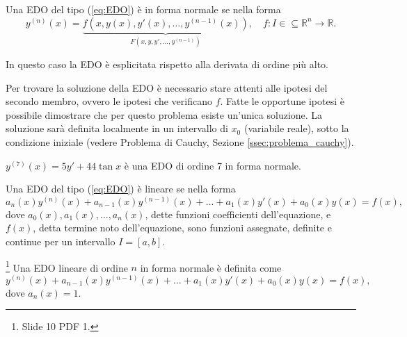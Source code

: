 \begin{definition}
    Una EDO del tipo (\ref{eq:EDO}) è in forma normale se nella forma
    \begin{equation}\label{eq:EDO_forma_normale}
        y^{(n)}(x)=\underbrace{f(x, y(x), y'(x),\hdots,y^{(n-1)}(x))}_{F(x, y, y',\hdots, y^{(n-1)})}, \quad f\colon I\in\subseteq\mathbb R^{n}\rightarrow\mathbb R.
    \end{equation}
\end{definition}

In questo caso la EDO è esplicitata rispetto alla derivata di ordine più alto.

Per trovare la soluzione della EDO è necessario stare attenti alle ipotesi del secondo membro, ovvero le ipotesi che verificano $f$. Fatte le opportune ipotesi è possibile dimostrare che per questo problema esiste un'unica soluzione. La soluzione sarà definita localmente in un intervallo di $x_0$ (variabile reale), sotto la condizione iniziale (vedere Problema di Cauchy, Sezione \ref{ssec:problema_cauchy}).

\begin{example}
    $y^{(7)}(x)=5y'+44\tan x$ è una EDO di ordine 7 in forma normale.
\end{example}
\begin{definition}
    Una EDO del tipo (\ref{eq:EDO}) è lineare se nella forma
    \begin{equation}\label{eq:EDO_lineare_ordine_n}
        a_n(x)y^{(n)}(x)+a_{n-1}(x)y^{(n-1)}(x)+\hdots+a_1(x)y'(x)+a_0(x)y(x)=f(x),
    \end{equation}
    dove $a_0(x),a_1(x),\hdots, a_n(x)$, dette funzioni coefficienti dell'equazione, e  $f(x)$, detta termine noto dell'equazione, sono funzioni assegnate, definite e continue per un intervallo $I=[a,b]$.
\end{definition}

\begin{definition}\label{def:EDO_lineare_completa_ordine_n_forma_normale}\footnote{Slide 10 PDF 1.}
    Una EDO lineare di ordine $n$ in forma normale è definita come
    \begin{equation}\label{eq:EDO_lineare_ordine_n_forma_normale}
        y^{(n)}(x)+a_{n-1}(x)y^{(n-1)}(x)+\hdots+a_1(x)y'(x)+a_0(x)y(x)=f(x),
    \end{equation}
    dove $a_n(x)=1$.
\end{definition}

